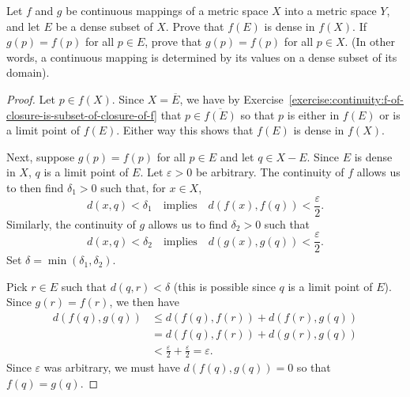 \label{exercise:continuity:continuous-map-on-dense-subset}
Let $f$ and $g$ be continuous mappings of a metric space $X$ into a
metric space $Y$, and let $E$ be a dense subset of $X$. Prove that
$f(E)$ is dense in $f(X)$. If $g(p) = f(p)$ for all $p\in E$, prove
that $g(p) = f(p)$ for all $p\in X$. (In other words, a continuous
mapping is determined by its values on a dense subset of its domain).
\begin{proof}
  Let $p\in f(X)$. Since $X = \overline{E}$, we have by
  Exercise~\ref{exercise:continuity:f-of-closure-is-subset-of-closure-of-f}
  that $p\in\overline{f(E)}$ so that $p$ is either in $f(E)$ or is a
  limit point of $f(E)$. Either way this shows that $f(E)$ is dense in
  $f(X)$.

  Next, suppose $g(p) = f(p)$ for all $p\in E$ and let $q\in X -
  E$. Since $E$ is dense in $X$, $q$ is a limit point of $E$. Let
  $\varepsilon>0$ be arbitrary. The continuity of $f$ allows us to
  then find $\delta_1>0$ such that, for $x\in X$,
  \begin{equation*}
    d(x,q) < \delta_1
    \quad\text{implies}\quad
    d(f(x),f(q)) < \frac\varepsilon2.
  \end{equation*}
  Similarly, the continuity of $g$ allows us to find $\delta_2>0$ such
  that
  \begin{equation*}
    d(x,q) < \delta_2
    \quad\text{implies}\quad
    d(g(x),g(q)) < \frac\varepsilon2.
  \end{equation*}
  Set $\delta = \min(\delta_1,\delta_2)$.

  Pick $r\in E$ such that $d(q,r) < \delta$ (this is possible since
  $q$ is a limit point of $E$). Since $g(r) = f(r)$, we then have
  \begin{align*}
    d(f(q),g(q)) &\leq d(f(q),f(r)) + d(f(r),g(q)) \\
                 &= d(f(q),f(r)) + d(g(r),g(q)) \\
                 &< \frac\varepsilon2 + \frac\varepsilon2
                   = \varepsilon.
  \end{align*}
  Since $\varepsilon$ was arbitrary, we must have $d(f(q),g(q)) = 0$
  so that $f(q) = g(q)$.
\end{proof}

